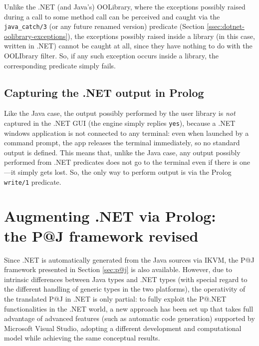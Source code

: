 Unlike the .NET (and Java's) OOLibrary, where the exceptions possibly raised during a call to some method call can be perceived and caught via the \texttt{java\_catch/3} (or any future renamed version) predicate (Section \ref{ssec:dotnet-oolibrary-exceptions}), the exceptions possibly raised inside a library (in this case, written in .NET) cannot be caught at all, since they have nothing to do with the OOLIbrary filter.
So, if any such exception occurs inside a library, the corresponding predicate simply fails.

\subsection{Capturing the .NET output in Prolog}

Like the Java case, the output possibly performed by the user library is \textit{not} captured in the \tuprolog{}.NET GUI (the engine simply replies \texttt{yes}), because a .NET windows application is not connected to any terminal: even when launched by a command prompt, the app releases the terminal immediately, so no standard output is defined.
This means that, unlike the Java case, any output possibly performed from .NET predicates does not go to the terminal even if there is one---it simply gets lost. So, the only way to perform output is via the Prolog \texttt{write/1} predicate.



\section{Augmenting .NET via Prolog:\\the P@J framework revised}
\label{sec:dotnet-pj}

Since \tuprolog{}.NET is automatically generated from the Java sources via IKVM, the P@J framework presented in Section \ref{sec:p@j} is also available.
%
However, due to intrinsic differences between Java types and .NET types (with special regard to the different handling of generic types in the two platforms), the operativity of the translated P@J in .NET is only partial: to fully exploit the P@.NET functionalities in the .NET world, a new approach has been set up that takes full advantage of advanced features (such as automatic code generation) supported by Microsoft Visual Studio, adopting a different development and computational model while achieving the same conceptual results.

